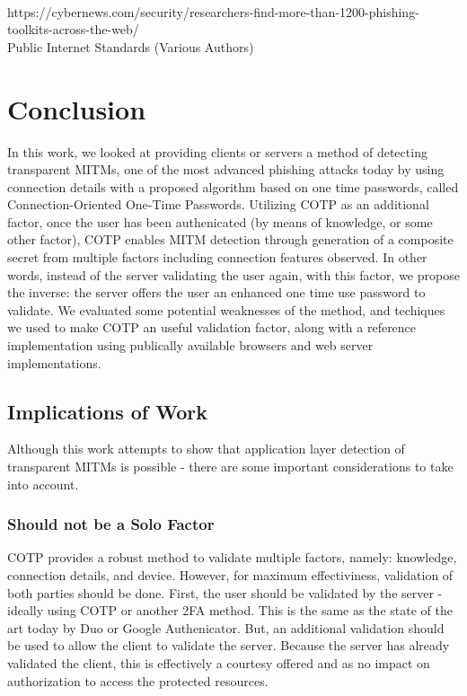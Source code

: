 \documentclass[a4paper, 11pt]{article} 				%
\begin{document}
\\
https://cybernews.com/security/researchers-find-more-than-1200-phishing-toolkits-across-the-web/\\

\noindent
[-]Public Internet Standards (Various Authors)\\


\section{Conclusion}
In this work, we looked at providing clients or servers a method of detecting transparent MITMs, one of the most advanced phishing attacks today by using connection details with a proposed algorithm based on one time passwords, called Connection-Oriented One-Time Passwords. Utilizing COTP as an additional factor, once the user has been authenicated (by means of knowledge, or some other factor), COTP enables MITM detection through generation of a composite secret from multiple factors including connection features observed. In other words, instead of the server validating the user again, with this factor, we propose the inverse: the server offers the user an enhanced one time use password to validate. We evaluated some potential weaknesses of the method, and techiques we used to make COTP an useful validation factor, along with a reference implementation using publically available browsers and web server implementations.

\subsection{Implications of Work}
Although this work attempts to show that application layer detection of transparent MITMs is possible - there are some important considerations to take into account.

\subsubsection{Should not be a Solo Factor}
COTP provides a robust method to validate multiple factors, namely: knowledge, connection details, and device. However, for maximum effectiviness, validation of both parties should be done. First, the user should be validated by the server - ideally using COTP or another 2FA method. This is the same as the state of the art today by Duo or Google Authenicator. But, an additional validation should be used to allow the client to validate the server. Because the server has already validated the client, this is effectively a courtesy offered and as no impact on authorization to access the protected resources.
\end{document}
